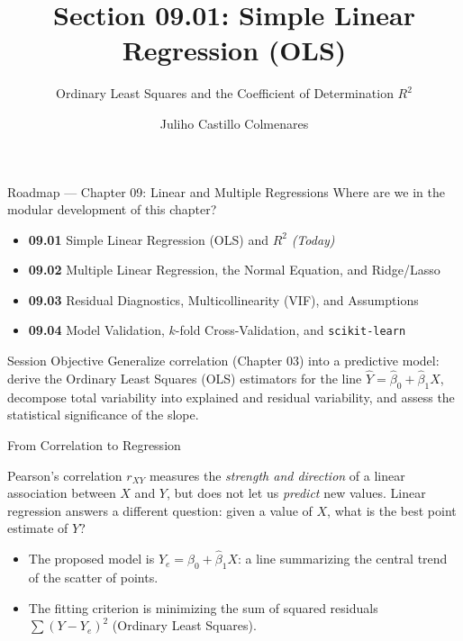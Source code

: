 \documentclass[10pt, aspectratio=169]{beamer}
\title[Simple Linear Regression]{Section 09.01: Simple Linear Regression (OLS)}
\subtitle{Ordinary Least Squares and the Coefficient of Determination $R^2$}
\author[J. Castillo Colmenares]{Juliho Castillo Colmenares}
\institute{Tecnológico de Monterrey}
\date{\vspace{-1.5cm}}
\begin{document}
\begin{frame}[plain]
  \titlepage
\end{frame}

\begin{frame}{Roadmap --- Chapter 09: Linear and Multiple Regressions}
  \footnotesize
  Where are we in the modular development of this chapter? \pause
  \begin{itemize}\itemsep=0.08em
    \item \textbf{09.01} Simple Linear Regression (OLS) and $R^2$ \emph{(Today)} \pause
    \item \textbf{09.02} Multiple Linear Regression, the Normal Equation, and Ridge/Lasso \pause
    \item \textbf{09.03} Residual Diagnostics, Multicollinearity (VIF), and Assumptions \pause
    \item \textbf{09.04} Model Validation, $k$-fold Cross-Validation, and \texttt{scikit-learn}
  \end{itemize}
  \vspace{-0.05cm}
  \begin{block}{Session Objective}
    Generalize correlation (Chapter 03) into a predictive model: derive the Ordinary Least Squares (OLS) estimators for the line $\hat Y=\hat\beta_0+\hat\beta_1 X$, decompose total variability into explained and residual variability, and assess the statistical significance of the slope.
  \end{block}
\end{frame}

\begin{frame}{From Correlation to Regression}
  \footnotesize
  \begin{motivacion}
    Pearson's correlation $r_{XY}$ measures the \emph{strength and direction} of a linear association between $X$ and $Y$, but does not let us \emph{predict} new values. Linear regression answers a different question: given a value of $X$, what is the best point estimate of $Y$?
  \end{motivacion}

  \vspace{0.15cm}
  \pause
  \begin{itemize}\itemsep=0.1cm
    \item The proposed model is $Y_e=\hat\beta_0+\hat\beta_1 X$: a line summarizing the central trend of the scatter of points. \pause
    \item The fitting criterion is minimizing the sum of squared residuals $\sum(Y-Y_e)^2$ (Ordinary Least Squares).
  \end{itemize}
\end{frame}
\end{document}
